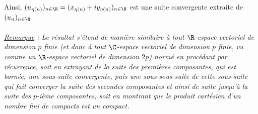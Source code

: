 \documentclass{book}
\begin{document}
\begin{enumerate}[leftmargin=*]
		Ainsi, $(u_{\eta(n)})_{n\in \N}=(x_{\eta(n)}+iy_{\eta(n)})_{n\in \N}$ est une suite convergente extraite de $(u_n)_{n\in \N}$.\\\\
		\textit{\underline{Remarque} : Le résultat s'étend de manière similaire à tout $\R$-espace vectoriel de dimension $p$ finie (et donc à tout $\C$-espace vectoriel de dimension $p$ finie, vu comme un $\R$-espace vectoriel de dimension $2p$) normé en procédant par récurrence, soit en extrayant de la suite des premières composantes, qui est bornée, une sous-suite convergente, puis une sous-sous-suite de cette sous-suite qui fait converger la suite des secondes composantes et ainsi de suite jusqu'à la suite des $p$-ième composantes, soit en montrant que le produit cartésien d'un nombre fini de compacts est un compact.}
	\end{enumerate}
	
\end{document}

